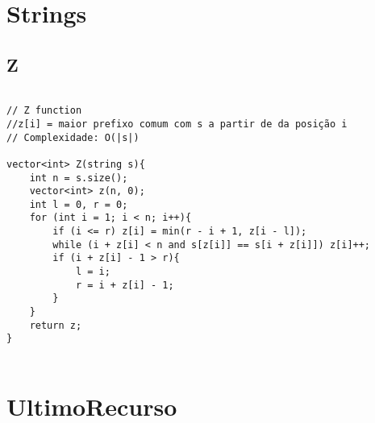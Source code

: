 \documentclass[landscape,twocolumn,10pt,a4paper]{article}
\begin{document}
\section{Strings}
\subsection{Z}
\begin{verbatim}

// Z function
//z[i] = maior prefixo comum com s a partir de da posição i
// Complexidade: O(|s|)

vector<int> Z(string s){
    int n = s.size();
    vector<int> z(n, 0);
    int l = 0, r = 0;
    for (int i = 1; i < n; i++){
        if (i <= r) z[i] = min(r - i + 1, z[i - l]);
        while (i + z[i] < n and s[z[i]] == s[i + z[i]]) z[i]++;
        if (i + z[i] - 1 > r){
            l = i;
            r = i + z[i] - 1;
        }
    }
    return z;
}


\end{verbatim}

\section{UltimoRecurso}
\end{document}
